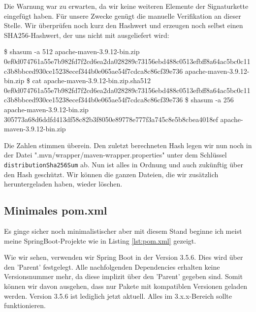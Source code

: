 Die Warnung war zu erwarten, da wir keine weiteren Elemente der Signaturkette 
eingefügt haben. Für unsere Zwecke genügt die manuelle Verifikation an dieser 
Stelle. Wir überprüfen noch kurz den Hashwert und erzeugen noch selbst einen
SHA256-Hashwert, der uns nicht mit ausgeliefert wird:

\begin{terminalbox}
\begin{VerbatimBreak}
\$ shasum -a 512 apache-maven-3.9.12-bin.zip
0ef0d074761a55e7b982fd7f2cd6ea2da028289c73156ebd488c0513efbff8a64ac5bc0c11c3b8bbced930ce15238ecef344b0e065ae54f7cdca8c86cf39e736  apache-maven-3.9.12-bin.zip
\$ cat apache-maven-3.9.12-bin.zip.sha512 
0ef0d074761a55e7b982fd7f2cd6ea2da028289c73156ebd488c0513efbff8a64ac5bc0c11c3b8bbced930ce15238ecef344b0e065ae54f7cdca8c86cf39e736
\$ shasum -a 256 apache-maven-3.9.12-bin.zip
305773a68d6ddfd413df58c82b3f8050e89778e777f3a745c8e5b8cbea4018ef apache-maven-3.9.12-bin.zip
\end{VerbatimBreak}
\end{terminalbox}

Die Zahlen stimmen überein. Den zuletzt berechneten Hash legen wir nun noch
in der Datei ".mvn/wrapper/maven-wrapper.properties" unter dem Schlüssel \texttt{distributionSha256Sum} ab.
Nun ist alles in Ordnung und auch zukünftig über den Hash geschützt. Wir können 
die ganzen Dateien, die wir zusätzlich heruntergeladen haben, wieder löschen.

\subsection{Minimales pom.xml}
Es ginge sicher noch minimalistischer aber mit diesem Stand beginne ich
meist meine SpringBoot-Projekte wie in Listing \ref{lst:pom.xml} gezeigt.

Wie wir sehen, verwenden wir Spring Boot in der Version 3.5.6. Dies wird über 
den 'Parent' festgelegt. Alle nachfolgenden Dependencies erhalten keine
Versionsnummer mehr, da diese implizit über den 'Parent' gegeben sind. Somit
können wir davon ausgehen, dass nur Pakete mit kompatiblen Versionen 
geladen werden. Version 3.5.6 ist lediglich jetzt aktuell. Alles im 3.x.x-Bereich
sollte funktionieren.

